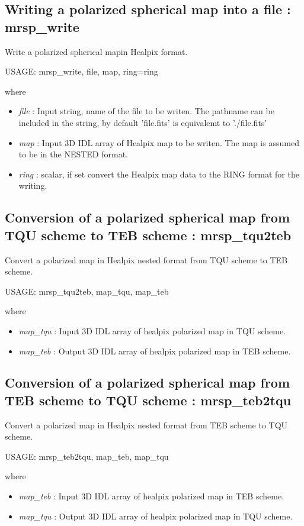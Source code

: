 \subsection{Writing a polarized spherical map into a file : mrsp\_write}
Write a polarized spherical mapin Healpix format.
{\bf
\begin{center}
     USAGE: mrsp\_write, file, map, ring=ring
\end{center}}
where
\begin{itemize}
\item {\em file} : Input string, name of the file to be writen. The pathname can be included in the string, by default 'file.fits' is equivalemt to './file.fits'
\item {\em map} : Input 3D IDL array of Healpix map to be writen. The map is assumed to be in the NESTED format.
\item {\em ring} : scalar, if set convert the Healpix map data to the RING format for the writing.
\end{itemize}



\subsection{Conversion of a polarized spherical map from TQU scheme to TEB scheme : mrsp\_tqu2teb}
Convert a polarized map in Healpix nested format from TQU scheme to TEB scheme.
{\bf
\begin{center}
     USAGE: mrsp\_tqu2teb, map\_tqu, map\_teb
\end{center}}
where
\begin{itemize}
\item {\em map\_tqu} : Input 3D IDL array of healpix polarized map in TQU scheme.
\item {\em map\_teb} : Output 3D IDL array of healpix polarized map in TEB scheme.
\end{itemize}



\subsection{Conversion of a polarized spherical map from TEB scheme to TQU scheme : mrsp\_teb2tqu}
Convert a polarized map in Healpix nested format from TEB scheme to TQU scheme.
{\bf
\begin{center}
     USAGE: mrsp\_teb2tqu, map\_teb, map\_tqu
\end{center}}
where
\begin{itemize}
\item {\em map\_teb} : Input 3D IDL array of healpix polarized map in TEB scheme.
\item {\em map\_tqu} : Output 3D IDL array of healpix polarized map in TQU scheme.
\end{itemize}




